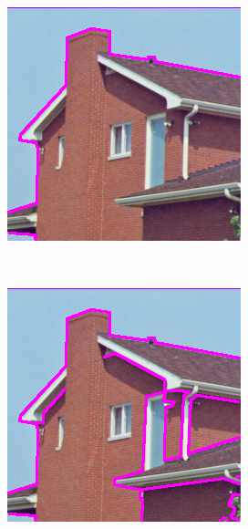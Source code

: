 \begin{figure}[h]
  \centering
  \begin{subfigure}[b]{0.3\textwidth}
    \includegraphics[width=\textwidth]{imgs/granularidade_1}
  \end{subfigure}%
  ~
  \begin{subfigure}[b]{0.3\textwidth}
    \includegraphics[width=\textwidth]{imgs/granularidade_2}

\end{subfigure}
\end{figure}
